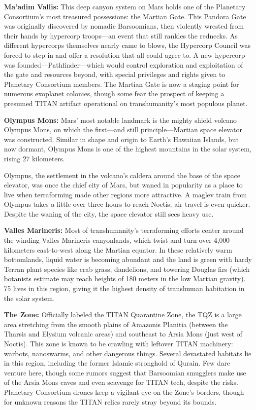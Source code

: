 \textbf{Ma'adim Vallis:} This deep canyon system on 
Mars holds one of the Planetary Consortium's most 
treasured possessions: the Martian Gate. This Pandora Gate was originally discovered by nomadic 
Barsoomians, then violently wrested from their hands 
by hypercorp troops—an event that still rankles the 
rednecks. As different hypercorps themselves nearly 
came to blows, the Hypercorp Council was forced to 
step in and offer a resolution that all could agree to. 
A new hypercorp was founded—Pathfinder—which 
would control exploration and exploitation of the 
gate and resources beyond, with special privileges and 
rights given to Planetary Consortium members. The 
Martian Gate is now a staging point for numerous 
exoplanet colonies, though some fear the prospect of 
keeping a presumed TITAN artifact operational on 
transhumanity's most populous planet.

\textbf{Olympus Mons:} Mars' most notable landmark is 
the mighty shield volcano Olympus Mons, on which 
the first—and still principle—Martian space elevator 
was constructed. Similar in shape and origin to Earth's 
Hawaiian Islands, but now dormant, Olympus Mons 
is one of the highest mountains in the solar system, 
rising 27 kilometers.

Olympus, the settlement in the volcano's caldera 
around the base of the space elevator, was once the 
chief city of Mars, but waned in popularity as a place 
to live when terraforming made other regions more 
attractive. A maglev train from Olympus takes a little 
over three hours to reach Noctis; air travel is even 
quicker. Despite the waning of the city, the space elevator still sees heavy use.

\textbf{Valles Marineris:} Most of transhumanity's terraforming efforts center around the winding Valles 
Marineris canyonlands, which twist and turn over 
4,000 kilometers east-to-west along the Martian 
equator. In these relatively warm bottomlands, liquid 
water is becoming abundant and the land is green with 
hardy Terran plant species like crab grass, dandelions, 
and towering Douglas firs (which botanists estimate 
may reach heights of 180 meters in the low Martian 
gravity). 75%
lives in this region, giving it the highest density of 
transhuman habitation in the solar system.

\textbf{The Zone:} Officially labeled the TITAN Quarantine Zone, the TQZ is a large area stretching from 
the smooth plains of Amazonis Planitia (between the 
Tharsis and Elysium volcanic areas) and southeast to 
Arsia Mons (just west of Noctis). This zone is known 
to be crawling with leftover TITAN machinery: 
warbots, nanoswarms, and other dangerous things. 
Several devastated habitats lie in this region, including 
the former Islamic stronghold of Qurain. Few dare 
venture here, though some rumors suggest that Barsoomian smugglers make use of the Arsia Mons caves 
and even scavenge for TITAN tech, despite the risks. 
Planetary Consortium drones keep a vigilant eye on 
the Zone's borders, though for unknown reasons the 
TITAN relics rarely stray beyond its bounds.

